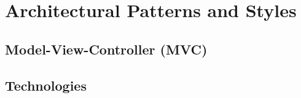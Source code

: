 \documentclass[a4paper,12pt,titlepage]{article}
\begin{document}
\section{Architectural Patterns and Styles}
	\subsection{Model-View-Controller (MVC)}
	
	
	\subsection{Technologies}
	
	
	
	
\end{document}
